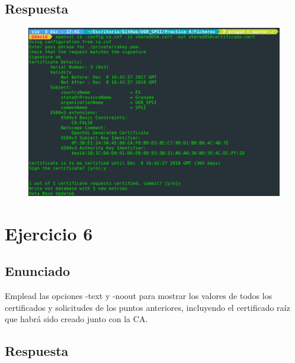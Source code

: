 \documentclass[10pt,a4paper,spanish]{report}
\begin{document}
\section{Respuesta}
\noindent
\begin{figure}[!hbp]
 \centering  \includegraphics[width=1\textwidth]{./Imagenes/5.png}
\end{figure}

\chapter{Ejercicio 6}

\section{Enunciado}
\noindent
Emplead las opciones -text y -noout para mostrar los valores de todos los certificados y solicitudes de los puntos anteriores, incluyendo el certificado raíz que habrá sido creado junto con la CA.

\section{Respuesta}
\noindent

\end{document}
